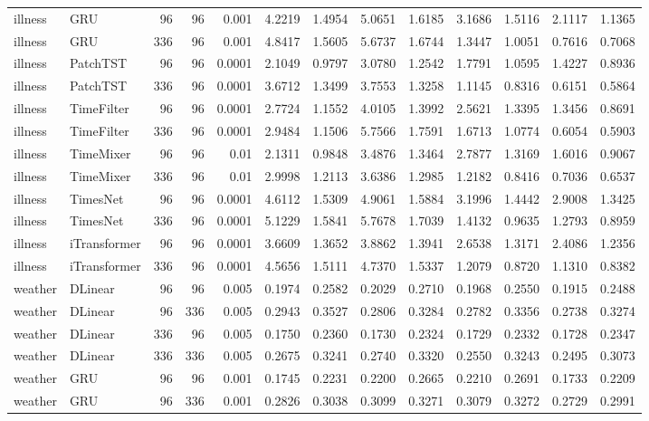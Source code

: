 \begin{longtable}{@{}llrrr*{8}{r}@{}}
illness & GRU & 96 & 96 & 0.001 & 4.2219 & 1.4954 & 5.0651 & 1.6185 & 3.1686 & 1.5116 & 2.1117 & 1.1365 \\
illness & GRU & 336 & 96 & 0.001 & 4.8417 & 1.5605 & 5.6737 & 1.6744 & 1.3447 & 1.0051 & 0.7616 & 0.7068 \\
illness & PatchTST & 96 & 96 & 0.0001 & 2.1049 & 0.9797 & 3.0780 & 1.2542 & 1.7791 & 1.0595 & 1.4227 & 0.8936 \\
illness & PatchTST & 336 & 96 & 0.0001 & 3.6712 & 1.3499 & 3.7553 & 1.3258 & 1.1145 & 0.8316 & 0.6151 & 0.5864 \\
illness & TimeFilter & 96 & 96 & 0.0001 & 2.7724 & 1.1552 & 4.0105 & 1.3992 & 2.5621 & 1.3395 & 1.3456 & 0.8691 \\
illness & TimeFilter & 336 & 96 & 0.0001 & 2.9484 & 1.1506 & 5.7566 & 1.7591 & 1.6713 & 1.0774 & 0.6054 & 0.5903 \\
illness & TimeMixer & 96 & 96 & 0.01 & 2.1311 & 0.9848 & 3.4876 & 1.3464 & 2.7877 & 1.3169 & 1.6016 & 0.9067 \\
illness & TimeMixer & 336 & 96 & 0.01 & 2.9998 & 1.2113 & 3.6386 & 1.2985 & 1.2182 & 0.8416 & 0.7036 & 0.6537 \\
illness & TimesNet & 96 & 96 & 0.0001 & 4.6112 & 1.5309 & 4.9061 & 1.5884 & 3.1996 & 1.4442 & 2.9008 & 1.3425 \\
illness & TimesNet & 336 & 96 & 0.0001 & 5.1229 & 1.5841 & 5.7678 & 1.7039 & 1.4132 & 0.9635 & 1.2793 & 0.8959 \\
illness & iTransformer & 96 & 96 & 0.0001 & 3.6609 & 1.3652 & 3.8862 & 1.3941 & 2.6538 & 1.3171 & 2.4086 & 1.2356 \\
illness & iTransformer & 336 & 96 & 0.0001 & 4.5656 & 1.5111 & 4.7370 & 1.5337 & 1.2079 & 0.8720 & 1.1310 & 0.8382 \\
weather & DLinear & 96 & 96 & 0.005 & 0.1974 & 0.2582 & 0.2029 & 0.2710 & 0.1968 & 0.2550 & 0.1915 & 0.2488 \\
weather & DLinear & 96 & 336 & 0.005 & 0.2943 & 0.3527 & 0.2806 & 0.3284 & 0.2782 & 0.3356 & 0.2738 & 0.3274 \\
weather & DLinear & 336 & 96 & 0.005 & 0.1750 & 0.2360 & 0.1730 & 0.2324 & 0.1729 & 0.2332 & 0.1728 & 0.2347 \\
weather & DLinear & 336 & 336 & 0.005 & 0.2675 & 0.3241 & 0.2740 & 0.3320 & 0.2550 & 0.3243 & 0.2495 & 0.3073 \\
weather & GRU & 96 & 96 & 0.001 & 0.1745 & 0.2231 & 0.2200 & 0.2665 & 0.2210 & 0.2691 & 0.1733 & 0.2209 \\
weather & GRU & 96 & 336 & 0.001 & 0.2826 & 0.3038 & 0.3099 & 0.3271 & 0.3079 & 0.3272 & 0.2729 & 0.2991 \\

\end{longtable}

